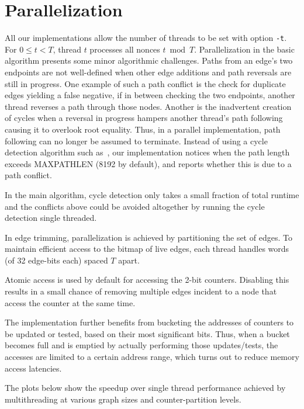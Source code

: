 \documentclass[11pt, oneside]{article}
\begin{document}
\section{Parallelization}
All our implementations allow the number of threads to be set with option {\tt -t}.
For $0\leq t < T$, thread $t$ processes all nonces $t \bmod T$.
Parallelization in the basic algorithm presents some minor algorithmic challenges.
Paths from an edge's two endpoints
are not well-defined when other edge additions and path reversals are still in progress.
One example of such a path conflict is the check for duplicate edges yielding a false negative,
if in between checking the two endpoints, another thread reverses a path through those nodes.
Another is the inadvertent creation of cycles when a reversal in progress hampers another thread's
path following causing it to overlook root equality.
Thus, in a parallel implementation, path following can no longer be assumed to terminate.
Instead of using a cycle detection algorithm such as~\cite{1980-brent-cycles}, our implementation
notices when the path length exceeds MAXPATHLEN (8192 by default),
and reports whether this is due to a path conflict.

In the main algorithm, cycle detection only takes a small fraction of total runtime and
the conflicts above could be avoided altogether by running the cycle detection single threaded.

In edge trimming, parallelization is achieved by partitioning the set of edges. To maintain efficient access
to the bitmap of live edges, each thread handles words (of 32 edge-bits each) spaced $T$ apart.

Atomic access is used by default for accessing the 2-bit counters. Disabling this results in a small
chance of removing multiple edges incident to a node that access the counter at the same time.

The implementation further benefits from bucketing the addresses of counters to be updated or tested,
based on their most significant bits. Thus, when a bucket becomes full and is emptied by actually
performing those updates/tests, the accesses are limited to a certain address range, which turns
out to reduce memory access latencies.

The plots below show the speedup over single thread performance achieved by multithreading at various
graph sizes and counter-partition levels.
\end{document}
